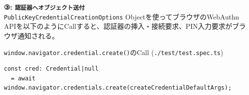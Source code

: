 \documentclass[12pt,dvipdfmx,uplatex]{beamer}
\begin{document}
\begin{frame}[fragile]
\small
\textbf{③: \texttt{認証器へオブジェクト送付}}\\[2ex]

\texttt{PublicKeyCredentialCreationOptions} Objectを使ってブラウザのWebAuthn APIを以下のようにCallすると、\alert{認証器の挿入・接続要求、PIN入力要求がブラウザ通知}される。

\begin{exampleblock}{\scriptsize \texttt{window.navigator.credential.create()}のCall (\texttt{./test/test.spec.ts})}
{\scriptsize
\begin{verbatim}
const cred: Credential|null
  = await window.navigator.credentials.create(createCredentialDefaultArgs);
\end{verbatim}
}
\end{exampleblock}

\vspace{2ex}


\end{frame}
\end{document}
